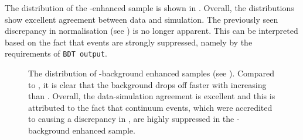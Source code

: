 The \EB distribution of the \BB-enhanced sample is shown in .
Overall, the distributions show excellent agreement between data and simulation.
The previously seen discrepancy in normalisation (see ) is no longer apparent.
This can be interpreted based on the fact that \epem\ra\qqbar events are strongly suppressed, namely 
by the requirements of \texttt{BDT~output}.
\begin{figure}[htbp!]
    \centering
    \caption{\label{fig:bbbar_enhanced_eb} The \EB distribution of \BB-background enhanced samples (see ).
    Compared to , it is clear that the \BB background drops off faster with increasing \EB than \epem\ra\qqbar.
    Overall, the data-simulation agreement is excellent and this is attributed to the fact that continuum events, which were accredited to causing a discrepancy in , are highly suppressed in the \BB-background enhanced sample.
    }
\end{figure}

